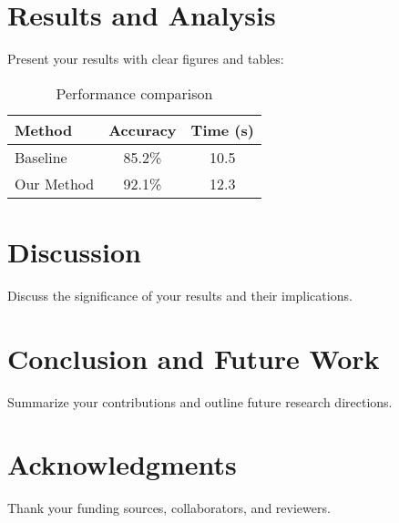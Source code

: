 \documentclass[10pt,twocolumn]{article}
\begin{document}
\section{Results and Analysis}
Present your results with clear figures and tables:

\begin{table}[h]
\centering
\begin{tabular}{|l|c|c|}
\hline
Method & Accuracy & Time (s) \\
\hline
Baseline & 85.2\% & 10.5 \\
Our Method & 92.1\% & 12.3 \\
\hline
\end{tabular}
\caption{Performance comparison}
\label{tab:results}
\end{table}

\section{Discussion}
Discuss the significance of your results and their implications.

\section{Conclusion and Future Work}
Summarize your contributions and outline future research directions.

\section*{Acknowledgments}
Thank your funding sources, collaborators, and reviewers.




\balance
\end{document}
